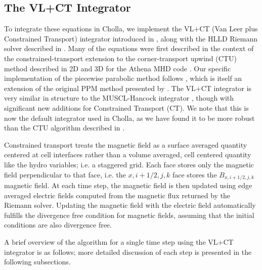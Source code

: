 \documentclass[modern, linenumbers]{aastex631}
\begin{document}
\subsection{The VL+CT Integrator}
\label{sec:vlct-summary}

To integrate these equations in Cholla, we implement the VL+CT (Van Leer plus Constrained Transport) integrator introduced in \cite{stone_2009}, along with the HLLD Riemann solver described in \cite{hlld_2005}. Many of the equations were first described in the context of the constrained-transport extension to the corner-transport upwind (CTU) method \citep{colella_1990} described in 2D \citep{gardiner_2005} and 3D \citep{gardiner_unsplit_2008} for the Athena MHD code \citep{stone_athena_2008}. Our specific implementation of the piecewise parabolic method follows \cite{felker_2018}, which is itself an extension of the original PPM method presented by \cite{colella_1984}. The VL+CT integrator is very similar in structure to the MUSCL-Hancock integrator \citep{van_leer_2006, falle_1991, Toro}, though with significant new additions for Constrained Transport (CT). We note that this is now the default integrator used in Cholla, as we have found it to be more robust than the CTU algorithm described in \cite{schneider_2015}.

Constrained transport treats the magnetic field as a surface averaged quantity centered at cell interfaces rather than a volume averaged, cell centered quantity like the hydro variables; i.e. a staggered grid. Each face stores only the magnetic field perpendicular to that face, i.e. the $x,i+1/2,j,k$ face stores the $B_{x,i+1/2,j,k}$ magnetic field. At each time step, the magnetic field is then updated using edge averaged electric fields computed from the magnetic flux returned by the Riemann solver. Updating the magnetic field with the electric field automatically fulfills the divergence free condition for magnetic fields, assuming that the initial conditions are also divergence free.

A brief overview of the algorithm for a single time step using the VL+CT integrator is as follows; more detailed discussion of each step is presented in the following subsections.
\end{document}
